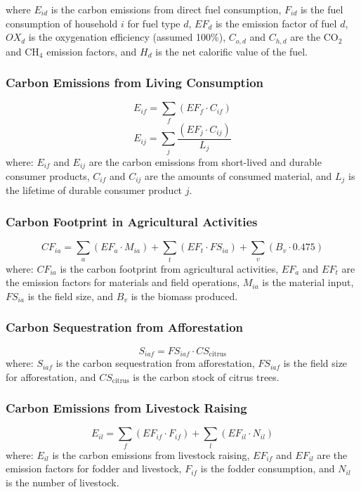 \documentclass[12pt,a4paper]{article}
\begin{document}
where $E_{id}$ is the carbon emissions from direct fuel consumption, $F_{id}$ is the fuel consumption of household $i$ for fuel type $d$, $EF_d$ is the emission factor of fuel $d$, $OX_d$ is the oxygenation efficiency (assumed 100\%), $C_{o,d}$ and $C_{h,d}$ are the CO$_2$ and CH$_4$ emission factors, and $H_d$ is the net calorific value of the fuel.


\subsubsection*{Carbon Emissions from Living Consumption}
\begin{equation}
E_{if} = \sum_f (EF_f \cdot C_{if})
\end{equation}
\begin{equation}
E_{ij} = \sum_j \frac{(EF_j \cdot C_{ij})}{L_j}
\end{equation}
where: $E_{if}$ and $E_{ij}$ are the carbon emissions from short-lived and durable consumer products, $C_{if}$ and $C_{ij}$ are the amounts of consumed material, and $L_j$ is the lifetime of durable consumer product $j$.


\subsubsection*{Carbon Footprint in Agricultural Activities}
\begin{equation}
CF_{ia} = \sum_a (EF_a \cdot M_{ia}) + \sum_t (EF_t \cdot FS_{ia}) + \sum_v (B_v \cdot 0.475)
\end{equation}
where: $CF_{ia}$ is the carbon footprint from agricultural activities, $EF_a$ and $EF_t$ are the emission factors for materials and field operations, $M_{ia}$ is the material input, $FS_{ia}$ is the field size, and $B_v$ is the biomass produced.


\subsubsection*{Carbon Sequestration from Afforestation}
\begin{equation}
S_{iaf} = FS_{iaf} \cdot CS_{\text{citrus}}
\end{equation}
where: $S_{iaf}$ is the carbon sequestration from afforestation, $FS_{iaf}$ is the field size for afforestation, and $CS_{\text{citrus}}$ is the carbon stock of citrus trees.


\subsubsection*{Carbon Emissions from Livestock Raising}
\begin{equation}
E_{il} = \sum_f (EF_{if} \cdot F_{if}) + \sum_l (EF_{il} \cdot N_{il})
\end{equation}
where: $E_{il}$ is the carbon emissions from livestock raising, $EF_{if}$ and $EF_{il}$ are the emission factors for fodder and livestock, $F_{if}$ is the fodder consumption, and $N_{il}$ is the number of livestock.
\end{document}
